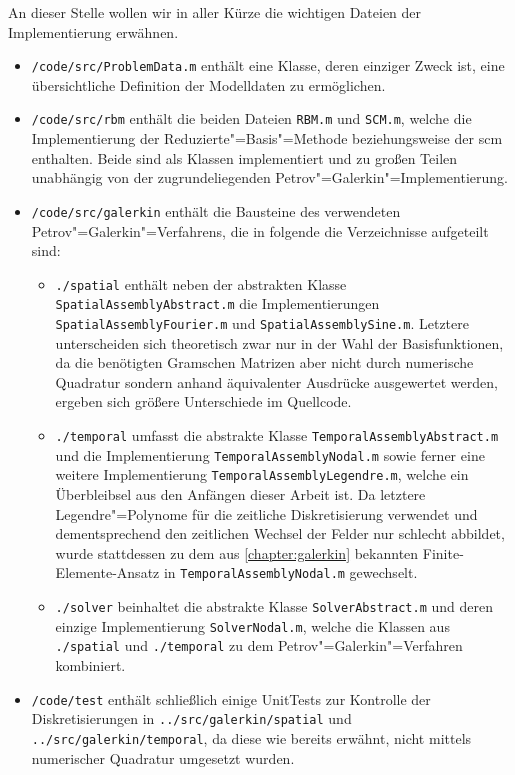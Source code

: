 \documentclass[../main.tex]{subfiles}
\begin{document}
An dieser Stelle wollen wir in aller Kürze die wichtigen Dateien der Implementierung erwähnen.
\begin{itemize}[leftmargin=1.5em]
    \item \verb!/code/src/ProblemData.m! enthält eine Klasse, deren einziger Zweck ist, eine übersichtliche Definition der Modelldaten zu ermöglichen.
    \item \verb!/code/src/rbm! enthält die beiden Dateien \verb!RBM.m! und \verb!SCM.m!, welche die Implementierung der Reduzierte"=Basis"=Methode beziehungsweise der \acl{scm} enthalten.
    Beide sind als Klassen implementiert und zu großen Teilen unabhängig von der zugrundeliegenden Petrov"=Galerkin"=Implementierung.
    \item \verb!/code/src/galerkin! enthält die Bausteine des verwendeten Petrov"=Galerkin"=Verfahrens, die in folgende die Verzeichnisse aufgeteilt sind:
    \begin{itemize}[leftmargin=1.5em]
        \item \verb!./spatial! enthält neben der abstrakten Klasse \verb!SpatialAssemblyAbstract.m! die Implementierungen \verb!SpatialAssemblyFourier.m! und \verb!SpatialAssemblySine.m!.
        Letztere unterscheiden sich theoretisch zwar nur in der Wahl der Basisfunktionen, da die benötigten Gramschen Matrizen aber nicht durch numerische Quadratur sondern anhand äquivalenter Ausdrücke ausgewertet werden, ergeben sich größere Unterschiede im Quellcode.
        \item \verb!./temporal! umfasst die abstrakte Klasse \verb!TemporalAssemblyAbstract.m! und die Implementierung \verb!TemporalAssemblyNodal.m! sowie ferner eine weitere Implementierung \verb!TemporalAssemblyLegendre.m!, welche ein Überbleibsel aus den Anfängen dieser Arbeit ist.
        Da letztere Legendre"=Polynome für die zeitliche Diskretisierung verwendet und dementsprechend den zeitlichen Wechsel der Felder nur schlecht abbildet, wurde stattdessen zu dem aus \cref{chapter:galerkin} bekannten Finite-Elemente-Ansatz in \verb!TemporalAssemblyNodal.m! gewechselt.
        \item \verb!./solver! beinhaltet die abstrakte Klasse \verb!SolverAbstract.m! und deren einzige Implementierung \verb!SolverNodal.m!, welche die Klassen aus \verb!./spatial! und \verb!./temporal! zu dem Petrov"=Galerkin"=Verfahren kombiniert.
    \end{itemize}
    \item \verb!/code/test! enthält schließlich einige UnitTests zur Kontrolle der Diskretisierungen in \verb!../src/galerkin/spatial! und \verb!../src/galerkin/temporal!, da diese wie bereits erwähnt, nicht mittels numerischer Quadratur umgesetzt wurden.
\end{itemize}
\end{document}
